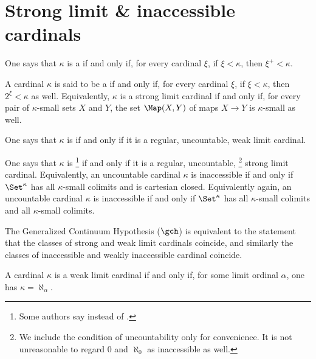 
\section{Strong limit \& inaccessible cardinals}%
\label{sec:stronglimitandinaccessiblecardinals}

\begin{definition}
	One says that $ \kappa $ is a  if and only if,
	for every cardinal $ \xi $,
	if $ \xi < \kappa $, then $ \xi^+ < \kappa $.

	A cardinal $\kappa$ is said to be a  if and only if,
	for every cardinal $ \xi $,
	if $ \xi < \kappa $, then $ 2^{\xi} < \kappa $ as well.
	Equivalently, $ \kappa $ is a strong limit cardinal if and only if,
	for every pair of $ \kappa $-small sets $ X $ and $ Y $,
	the set $ \Map(X, Y) $ of maps $ X \to Y $ is $ \kappa $-small as well. 

	One says that $\kappa$ is  if and only if
	it is a regular, uncountable, weak limit cardinal.

	One says that $\kappa$ is %
	\footnote{Some authors say 
	instead of .}
	if and only if it is a regular, uncountable,%
	\footnote{We include the condition of uncountability only for convenience.
		It is not unreasonable to regard $ 0 $ and $ \aleph_0 $
		as inaccessible as well.}
	strong limit cardinal.
	Equivalently, an uncountable cardinal $ \kappa $ is inaccessible if and only if
	$ \Set^{\kappa} $ has all $ \kappa $-small colimits and is cartesian closed.
	Equivalently again, an uncountable cardinal $ \kappa $ is inaccessible if and only if 
	$ \Set^{\kappa} $ has all $ \kappa $-small colimits and all $ \kappa $-small colimits.
\end{definition}

The Generalized Continuum Hypothesis ($ \gch $) is equivalent to the statement that
the classes of strong and weak limit cardinals coincide,
and similarly the classes of inaccessible and weakly inaccessible cardinal coincide.

\begin{eg}
	A cardinal $ \kappa $ is a weak limit cardinal if and only if,
	for some limit ordinal $ \alpha $, one has $ \kappa = \aleph_{\alpha} $.
\end{eg}

